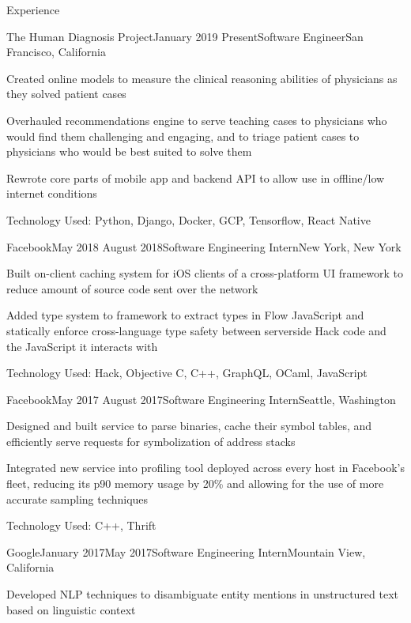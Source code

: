 \documentclass{resume} %
\begin{document}
\begin{rSection}{Experience}
\begin{rSubsection}{The Human Diagnosis Project}{January 2019 \textminus Present}{Software Engineer}{San Francisco, California}
\item[] Created online models to measure the clinical reasoning abilities of physicians as they solved patient cases
\item[] Overhauled recommendations engine to serve teaching cases to physicians who would find them challenging and engaging, and to triage patient cases to physicians who would be best suited to solve them
\item[] Rewrote core parts of mobile app and backend API to allow use in offline/low internet conditions
\item[] Technology Used: Python, Django, Docker, GCP, Tensorflow, React Native
\end{rSubsection}
\begin{rSubsection}{Facebook}{May 2018 \textminus August 2018}{Software Engineering Intern}{New York, New York}
\item[] Built on-client caching system for iOS clients of a cross-platform UI framework to reduce amount of source code sent over the network
\item[] Added type system to framework to extract types in Flow JavaScript and statically enforce cross-language type safety between serverside Hack code and the JavaScript it interacts with
\item[] Technology Used: Hack, Objective C, C++, GraphQL, OCaml, JavaScript
\end{rSubsection}
\begin{rSubsection}{Facebook}{May 2017 \textminus August 2017}{Software Engineering Intern}{Seattle, Washington}
\item[] Designed and built service to parse binaries, cache their symbol tables, and efficiently serve requests for symbolization of address stacks
\item[] Integrated new service into profiling tool deployed across every host in Facebook's fleet, reducing its p90 memory usage by 20\% and allowing for the use of more accurate sampling techniques
\item[] Technology Used: C++, Thrift
\end{rSubsection}
\begin{rSubsection}{Google}{January 2017\textminus May 2017}{Software Engineering Intern}{Mountain View, California}
\item[] Developed NLP techniques to disambiguate entity mentions in unstructured text based on linguistic context

\end{rSubsection}
\end{rSection}
\end{document}
